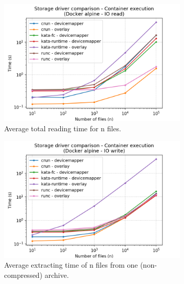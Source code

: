 \begin{figure}[h!]

  \begin{subfigure}{.5\textwidth}
    \centering
    \includegraphics[width=\linewidth]{images/runtime/runtime-execution-Docker-alpine---IO-read.png}
    \caption{Average total reading time for n files.}
    \label{fig:runtime:io-read-exec}
  \end{subfigure}
  \begin{subfigure}{.5\textwidth}
    \centering
    \includegraphics[width=\linewidth]{images/runtime/runtime-execution-Docker-alpine---IO-write.png}
    \caption{Average extracting time of n files from one (non-compressed) archive.}
    \label{fig:runtime:io-write-exec}
  \end{subfigure}
  
  \caption{}
  \label{fig:runtime:io}

\end{figure}

